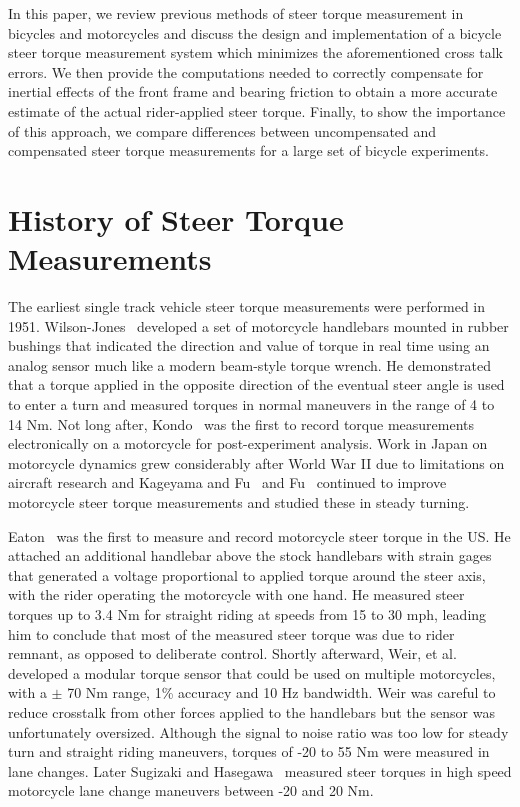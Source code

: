 \documentclass[10pt]{article}
\begin{document}
In this paper, we review previous methods of steer torque measurement in
bicycles and motorcycles and discuss the design and implementation of a bicycle
steer torque measurement system which minimizes the aforementioned cross talk
errors. We then provide the computations needed to correctly compensate for
inertial effects of the front frame and bearing friction to obtain a more
accurate estimate of the actual rider-applied steer torque. Finally, to show
the importance of this approach, we compare differences between uncompensated
and compensated steer torque measurements for a large set of bicycle
experiments.

\section*{History of Steer Torque Measurements}


The earliest single track vehicle steer torque measurements were performed in
1951. Wilson-Jones~\cite{Wilson-Jones1951} developed a set of motorcycle
handlebars mounted in rubber bushings that indicated the direction and value of
torque in real time using an analog sensor much like a modern beam-style torque
wrench. He demonstrated that a torque applied in the opposite direction of the
eventual steer angle is used to enter a turn and measured torques in normal
maneuvers in the range of 4 to 14 Nm. Not long after, Kondo~\cite{Kondo1955}
was the first to record torque measurements electronically on a motorcycle for
post-experiment analysis. Work in Japan on motorcycle dynamics grew
considerably after World War II due to limitations on aircraft research and
Kageyama and Fu~\cite{Kageyama1959} and Fu~\cite{Fu1965} continued to improve
motorcycle steer torque measurements and studied these in steady turning.


Eaton~\cite{Eaton1973} was the first to measure and record motorcycle steer
torque in the US. He attached an additional handlebar above the stock
handlebars with strain gages that generated a voltage proportional to applied
torque around the steer axis, with the rider operating the motorcycle with one
hand. He measured steer torques up to 3.4 Nm for straight riding at speeds from
15 to 30 mph, leading him to conclude that most of the measured steer torque
was due to rider remnant, as opposed to deliberate control. Shortly afterward,
Weir, et al.~\cite{Weir1979a} developed a modular torque sensor that could be
used on multiple motorcycles, with a $\pm$ 70 Nm range, 1\% accuracy and 10 Hz
bandwidth. Weir was careful to reduce crosstalk from other forces applied to
the handlebars but the sensor was unfortunately oversized. Although the signal
to noise ratio was too low for steady turn and straight riding maneuvers,
torques of -20 to 55 Nm were measured in lane changes. Later Sugizaki and
Hasegawa~\cite{Sugizaki1988} measured steer torques in high speed motorcycle
lane change maneuvers between -20 and 20 Nm.
\end{document}
